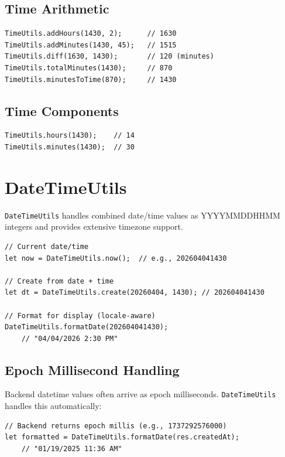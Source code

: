 \subsection{Time Arithmetic}

\begin{lstlisting}[style=javascript]
TimeUtils.addHours(1430, 2);      // 1630
TimeUtils.addMinutes(1430, 45);   // 1515
TimeUtils.diff(1630, 1430);       // 120 (minutes)
TimeUtils.totalMinutes(1430);     // 870
TimeUtils.minutesToTime(870);     // 1430
\end{lstlisting}

\subsection{Time Components}

\begin{lstlisting}[style=javascript]
TimeUtils.hours(1430);    // 14
TimeUtils.minutes(1430);  // 30
\end{lstlisting}

\section{DateTimeUtils}
\label{sec:feu-datetimeutils}

\texttt{DateTimeUtils} handles combined date/time values as YYYYMMDDHHMM integers and provides extensive timezone support.

\begin{lstlisting}[style=javascript]
// Current date/time
let now = DateTimeUtils.now();  // e.g., 202604041430

// Create from date + time
let dt = DateTimeUtils.create(20260404, 1430); // 202604041430

// Format for display (locale-aware)
DateTimeUtils.formatDate(202604041430);
    // "04/04/2026 2:30 PM"
\end{lstlisting}

\subsection{Epoch Millisecond Handling}

Backend datetime values often arrive as epoch milliseconds.  \texttt{DateTimeUtils} handles this automatically:

\begin{lstlisting}[style=javascript]
// Backend returns epoch millis (e.g., 1737292576000)
let formatted = DateTimeUtils.formatDate(res.createdAt);
    // "01/19/2025 11:36 AM"
\end{lstlisting}

